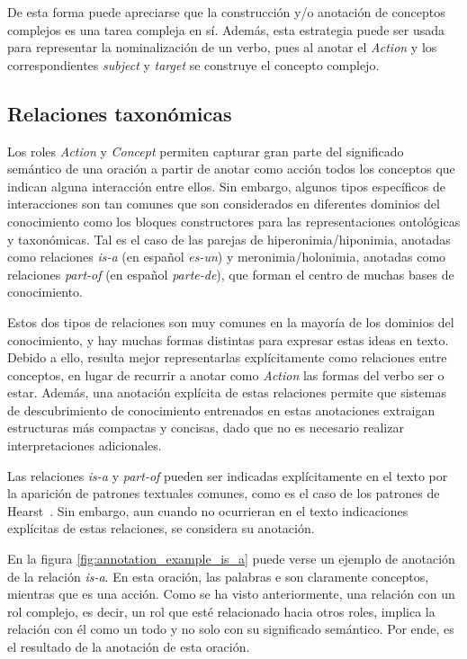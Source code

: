 De esta forma puede apreciarse que la construcción y/o anotación de conceptos complejos es una tarea compleja en sí. Además, esta estrategia puede ser usada para representar la nominalización de un verbo, pues al anotar el \textit{Action} y los correspondientes \textit{subject} y \textit{target} se
construye el concepto complejo.

\subsection{Relaciones taxonómicas}
Los roles \textit{Action} y \textit{Concept} permiten capturar gran parte del significado semántico de una oración a partir de anotar como acción todos los conceptos que indican alguna interacción entre ellos. Sin embargo, algunos tipos específicos de interacciones son tan comunes que son considerados en diferentes dominios del conocimiento como los bloques constructores para las representaciones ontológicas y taxonómicas. Tal es el caso de las parejas de hiperonimia/hiponimia, anotadas como relaciones \textit{is-a} (en español \textit{es-un}) y meronimia/holonimia, anotadas como relaciones \textit{part-of} (en español \textit{parte-de}), que forman el centro de muchas bases de conocimiento.

Estos dos tipos de relaciones son muy comunes en la mayoría de los dominios del conocimiento, y hay muchas formas distintas para expresar estas ideas en texto. Debido a ello, resulta mejor representarlas explícitamente como relaciones entre conceptos, en lugar de recurrir a anotar como \textit{Action} las formas del verbo ser o estar. Además, una anotación explícita de estas relaciones permite que sistemas de descubrimiento de conocimiento entrenados en estas anotaciones extraigan estructuras más compactas y concisas, dado que no es necesario realizar interpretaciones adicionales.

Las relaciones \textit{is-a} y \textit{part-of} pueden ser indicadas explícitamente en el texto por la aparición de patrones textuales comunes, como es el caso de los patrones de Hearst~\cite{ref:14}. Sin embargo, aun cuando no ocurrieran en el texto indicaciones explícitas de estas relaciones, se considera su anotación.

En la figura \ref{fig:annotation_example_is_a} puede verse un ejemplo de anotación de la relación \textit{is-a}. En esta oración, las palabras  e  son claramente conceptos, mientras que  es una acción. Como se ha visto anteriormente, una relación con un rol complejo, es decir, un rol que esté relacionado hacia otros roles, implica la relación con él como un todo y no solo con su significado semántico. Por ende,  es el resultado de la anotación de esta oración.


